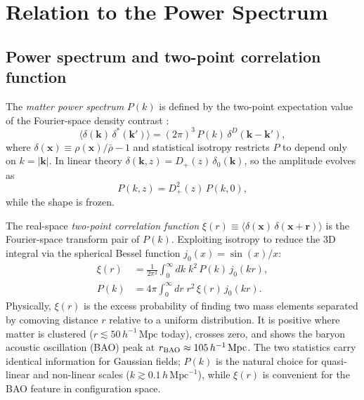 \documentclass[12pt]{article}
\newcommand{\bx}{\mathbf{x}}
\newcommand{\bk}{\mathbf{k}}
\newcommand{\br}{\mathbf{r}}
\newcommand{\Dp}{D_+}
\begin{document}
\section{Relation to the Power Spectrum}
\label{sec:pk}

\subsection{Power spectrum and two-point correlation function}
\label{sec:pk_xi}

The \emph{matter power spectrum} $P(k)$ is defined by the two-point
expectation value of the Fourier-space density contrast
\citep[e.g.][Eq.~1.2]{Jeong2010}:
%
\begin{equation}
  \langle \delta(\bk)\,\delta^*(\bk') \rangle
  = (2\pi)^3\,P(k)\,\delta^D(\bk - \bk'),
  \label{eq:pk_def}
\end{equation}
%
where $\delta(\bx) \equiv \rho(\bx)/\bar\rho - 1$ and statistical
isotropy restricts $P$ to depend only on $k = |\bk|$.  In linear
theory $\delta(\bk, z) = \Dp(z)\,\delta_0(\bk)$, so the amplitude
evolves as
%
\begin{equation}
  P(k, z) = \Dp^2(z)\,P(k, 0),
  \label{eq:pk_z}
\end{equation}
%
while the shape is frozen.

The real-space \emph{two-point correlation function}
$\xi(r) \equiv \langle\delta(\bx)\,\delta(\bx+\br)\rangle$ is the
Fourier-space transform pair of $P(k)$.  Exploiting isotropy to reduce
the 3D integral via the spherical Bessel function
$j_0(x) = \sin(x)/x$:
%
\begin{align}
  \xi(r) &= \frac{1}{2\pi^2}\int_0^\infty dk\; k^2\, P(k)\, j_0(kr),
  \label{eq:xi_pk} \\[4pt]
  P(k)   &= 4\pi\int_0^\infty dr\; r^2\, \xi(r)\, j_0(kr).
  \label{eq:pk_xi_inv}
\end{align}
%
Physically, $\xi(r)$ is the excess probability of finding two mass
elements separated by comoving distance $r$ relative to a uniform
distribution.  It is positive where matter is clustered
($r \lesssim 50\,h^{-1}\,\mathrm{Mpc}$ today), crosses zero, and
shows the baryon acoustic oscillation (BAO) peak at
$r_{\rm BAO} \approx 105\,h^{-1}\,\mathrm{Mpc}$.  The two statistics
carry identical information for Gaussian fields; $P(k)$ is the natural
choice for quasi-linear and non-linear scales ($k \gtrsim
0.1\,h\,\mathrm{Mpc}^{-1}$), while $\xi(r)$ is convenient for the
BAO feature in configuration space.
\end{document}
